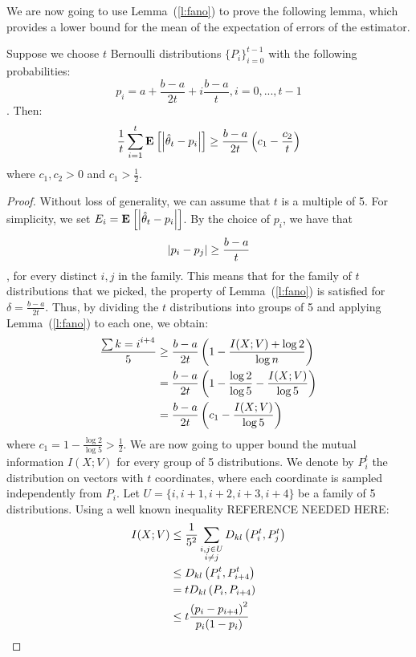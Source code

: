 We are now going to use Lemma~(\ref{l:fano}) to prove the following lemma,
which provides a lower bound for the mean of the expectation of errors
of the estimator.
\begin{lemma}\label{l:fano_application}
  Suppose we choose $t$ Bernoulli distributions $\{P_i\}_{i=0}^{t-1}$
  with the following probabilities:
  \[
    p_i = a+\frac{b-a}{2t} + i \frac{b-a}{t} , i=0, ..., t-1
  \].
  Then:
  $$
  \frac{1}{t} \sum_{i=1}^t \Exp{\lp|\hat{\theta}_t-p_i\rp|}
  \geq \frac{b-a}{2t} \lp(c_1 - \frac{c_2}{t}\rp)
  $$
  where $c_1, c_2 >0$ and $c_1 > \frac{1}{2}$.
\end{lemma}
\begin{proof}
  Without loss of generality, we can assume that $t$ is a multiple of 5.
  For simplicity, we set $E_i = \Exp{\lp|\hat{\theta}_t-p_i\rp|}$.
  By the choice of $p_i$, we have that $$\left|p_i - p_j\right| \geq \frac{b-a}{t}$$,
  for every distinct $i,j$ in the family.
  This means that for the family of $t$ distributions that we picked, the property
  of Lemma~(\ref{l:fano}) is satisfied for $\delta = \frac{b-a}{2t}$.
  Thus, by dividing the $t$ distributions into groups of 5 and applying
  Lemma~(\ref{l:fano}) to each one, we obtain:
  \begin{align}\label{eq:fano}
    \frac{\sum{k =i}^{i+4}}{5}
    &\geq
    \frac{b-a}{2t}\left(1-\frac{I(X;V)+\log 2}{\log n}\right) \nonumber\\
    &=
    \frac{b-a}{2t}\left(1- \frac{\log 2}{\log 5} - \frac{I(X;V)}{\log5}\right) \nonumber\\
    &=
    \frac{b-a}{2t}\left(c_1 - \frac{I(X;V)}{\log5}\right)
  \end{align}
  where $c_1 = 1-\frac{\log2}{\log5} > \frac{1}{2}$.
  We are now going to upper bound the mutual information $I(X;V)$ for every
  group of 5 distributions. We denote by $P_i^t$ the distribution on
  vectors with $t$ coordinates,
  where each coordinate is sampled independently from $P_i$.
  Let $U= \{i,i+1,i+2,i+3,i+4\}$ be a family of 5 distributions.
  Using a well known inequality REFERENCE NEEDED HERE:
  \begin{align*}
    I(X;V)
    &\leq
    \frac{1}{5^2}\sum_{\substack{i,j \in U \\i\neq j}} D_{kl}\lp(P_i^t,P_j^t\rp)\\
    &\leq
    D_{kl}\lp(P_i^t, P_{i+4}^t\rp)\\
    &=
    t D_{kl}\lp(P_i, P_{i+4}\rp)\\
    &\leq
    t \frac{\lp(p_i - p_{i+4}\rp)^2}{p_i(1-p_i)}\\

\end{align*}
\end{proof}
